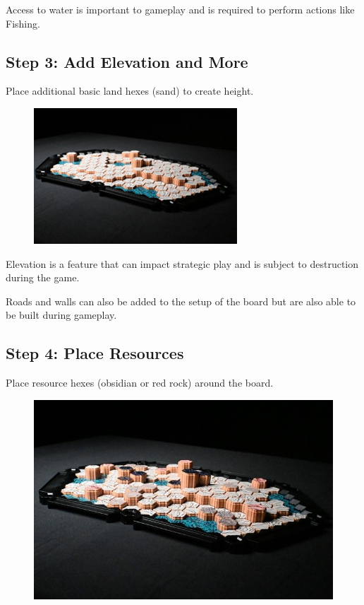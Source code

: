 \documentclass[../main.tex]{subfiles}
\begin{document}
Access to water is important to gameplay and is required to perform actions like Fishing.

\clearpage
\subsection{Step 3:  Add Elevation and More}
Place additional basic land hexes (sand) to create height.

\begin{figure}[h]
    \centering
    \includegraphics[width=1\linewidth]{chapters//boardsetup/sandplacement.png}
\end{figure}

Elevation is a feature that can impact strategic play and is subject to destruction during the game.

Roads and walls can also be added to the setup of the board but are also able to be built during gameplay.

\subsection{Step 4:  Place Resources}
Place resource hexes (obsidian or red rock) around the board.

\begin{figure}[h]
    \centering
    \includegraphics[width=1\linewidth]{chapters//boardsetup/TimeStrikePlaceResources.jpg}
\end{figure}
\end{document}
